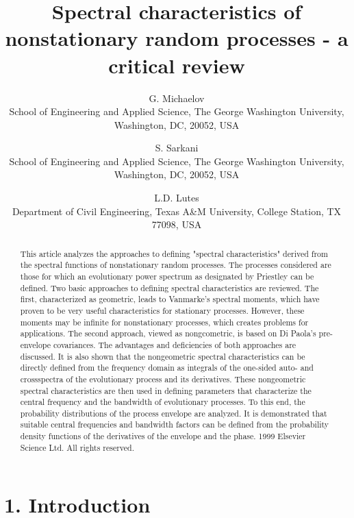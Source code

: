 \documentclass{article}
\newcommand{\tmaffiliation}[1]{\\ #1}
\begin{document}
\title{Spectral characteristics of nonstationary random processes - a critical
review}

\author{
  G. Michaelov
  \tmaffiliation{School of Engineering and Applied Science, The George
  Washington University, Washington, DC, 20052, USA}
  \and
  S. Sarkani
  \tmaffiliation{School of Engineering and Applied Science, The George
  Washington University, Washington, DC, 20052, USA}
  \and
  L.D. Lutes
  \tmaffiliation{Department of Civil Engineering, Texas A\&M University,
  College Station, TX 77098, USA}
}

\date{}

\maketitle

\begin{abstract}
  This article analyzes the approaches to defining "spectral characteristics"
  derived from the spectral functions of nonstationary random processes. The
  processes considered are those for which an evolutionary power spectrum as
  designated by Priestley can be defined. Two basic approaches to defining
  spectral characteristics are reviewed. The first, characterized as
  geometric, leads to Vanmarke's spectral moments, which have proven to be
  very useful characteristics for stationary processes. However, these moments
  may be infinite for nonstationary processes, which creates problems for
  applications. The second approach, viewed as nongcometric, is based on Di
  Paola's pre-envelope covariances. The advantages and deficiencies of both
  approaches are discussed. It is also shown that the nongeometric spectral
  characteristics can be directly defined from the frequency domain as
  integrals of the one-sided auto- and crossspectra of the evolutionary
  process and its derivatives. These nongeometric spectral characteristics are
  then used in defining parameters that characterize the central frequency and
  the bandwidth of evolutionary processes. To this end, the probability
  distributions of the process envelope are analyzed. It is demonstrated that
  suitable central frequencies and bandwidth factors can be defined from the
  probability density functions of the derivatives of the envelope and the
  phase. {\textcopyright} 1999 Elsevier Science Ltd. All rights reserved.
\end{abstract}

{\tableofcontents}

\section*{1. Introduction}
\end{document}
